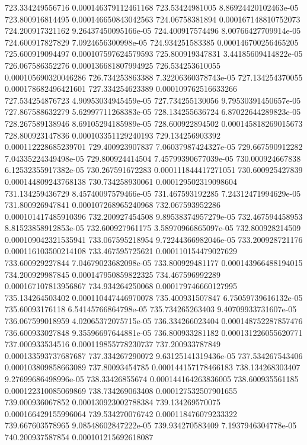 {723.334249556716 0.000146379112461168
723.53424981005 8.86924420102463e-05
723.800916814495 0.000146650843042563
724.06758381894 0.000167148810752073
724.200917321162 9.26437450095166e-05
724.400917574496 8.00766427709914e-05
724.600917827829 7.0924656300998e-05
724.934251583385 0.000146700256465205
725.600919094497 0.000107597624579593
725.800919347831 3.44185609414822e-05
726.067586352276 0.000136681807994925
726.534253610055 0.000105690320046286
726.734253863388 7.32206360378743e-05
727.134254370055 0.000178682496421601
727.334254623389 0.000109762516633266
727.534254876723 4.90953034945459e-05
727.734255130056 9.79530391450657e-05
727.867588632279 5.62997711268383e-05
728.134255636724 6.87022644289823e-05
728.267589138946 8.69105294185989e-05
728.600922894502 0.000145818269015673
728.800923147836 0.000103351129240193
729.134256903392 0.000112228685239701
729.400923907837 7.06037987424327e-05
729.667590912282 7.04335224349498e-05
729.800924414504 7.45799390677039e-05
730.000924667838 6.12532355917382e-05
730.267591672283 0.000111844417271051
730.600925427839 0.000144809243768138
730.734258930061 0.000129502319098604
731.134259436729 8.45740097579466e-05
731.467593192285 7.24312471994629e-05
731.800926947841 0.000107268965240968
732.067593952286 0.000101417485910396
732.200927454508 9.89538374957279e-05
732.467594458953 8.81523858912853e-05
732.600927961175 3.58970966865097e-05
732.800928214509 0.000109042321535941
733.067595218954 9.72244366982046e-05
733.200928721176 0.000116103500214108
733.467595725621 0.000110154479027629
733.600929227844 7.04679023682098e-05
733.800929481177 0.000143966488194015
734.200929987845 0.000147950859822325
734.467596992289 0.000167107813956867
734.934264250068 0.000179746660127995
735.134264503402 0.000110447446970078
735.400931507847 6.75059739616132e-05
735.60093176118 6.54145766864798e-05
735.734265263403 9.40709933731607e-05
736.067599018959 4.02065372075715e-05
736.334266023404 0.000148752287857476
736.600933027848 9.35596697644881e-05
736.800933281182 0.000131226055620771
737.000933534516 0.000119855778230737
737.200933787849 0.000133593737687687
737.334267290072 9.63125141319436e-05
737.534267543406 0.000103809858663089
737.80093454785 0.000144157178466183
738.134268303407 9.27699686498996e-05
738.33426855674 0.000144164263836005
738.600935561185 0.000122310085069869
738.734269063408 0.000127532507901655
739.000936067852 0.000130923002788384
739.134269570075 0.000166429155996064
739.534270076742 0.000118476079233322
739.667603578965 9.08548602847222e-05
739.934270583409 7.1937946304778e-05
740.200937587854 0.000101215692618087
}
